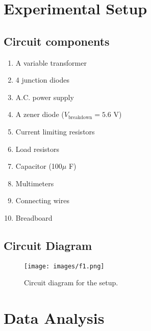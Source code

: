 \section{Experimental Setup}

\subsection*{Circuit components}
    \begin{enumerate}
        \item A variable transformer
        \item 4 junction diodes
        \item A.C. power supply
        \item A zener diode ($V_\text{breakdown} = 5.6$ V)
        \item Current limiting resistors
        \item Load resistors
        \item Capacitor (100$\mu$ F)
        \item Multimeters
        \item Connecting wires
        \item Breadboard
    \end{enumerate}

    \subsection*{Circuit Diagram}
    \begin{figure}[H]
        \centering
        \texttt{[image: images/f1.png]}
        \caption{Circuit diagram for the setup.}
        \label{fig:1}
    \end{figure}

\section{Data Analysis}
